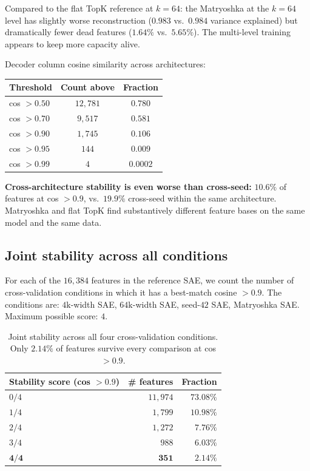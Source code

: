\documentclass[11pt]{article}
\begin{document}
Compared to the flat TopK reference at $k = 64$: the Matryoshka at the
$k = 64$ level has slightly worse reconstruction ($0.983$ vs.\ $0.984$
variance explained) but dramatically fewer dead features ($1.64\%$ vs.\
$5.65\%$). The multi-level training appears to keep more capacity alive.

Decoder column cosine similarity across architectures:

\begin{center}
\begin{tabular}{lcc}
\toprule
Threshold & Count above & Fraction \\
\midrule
cos $> 0.50$ & $12{,}781$ & $0.780$ \\
cos $> 0.70$ & $9{,}517$ & $0.581$ \\
cos $> 0.90$ & $1{,}745$ & $\mathbf{0.106}$ \\
cos $> 0.95$ & $144$ & $0.009$ \\
cos $> 0.99$ & $4$ & $0.0002$ \\
\bottomrule
\end{tabular}
\end{center}

\textbf{Cross-architecture stability is even worse than cross-seed:}
$10.6\%$ of features at cos $> 0.9$, vs.\ $19.9\%$ cross-seed within the
same architecture. Matryoshka and flat TopK find substantively different
feature bases on the same model and the same data.

\subsection{Joint stability across all conditions}
\label{sec:navigator}

For each of the $16{,}384$ features in the reference SAE, we count the
number of cross-validation conditions in which it has a best-match cosine
$> 0.9$. The conditions are: $4\text{k}$-width SAE, $64\text{k}$-width
SAE, seed-$42$ SAE, Matryoshka SAE. Maximum possible score: $4$.

\begin{table}[h]
\centering
\caption{Joint stability across all four cross-validation conditions.
Only $2.14\%$ of features survive every comparison at cos $> 0.9$.}
\label{tab:joint}
\begin{tabular}{lrr}
\toprule
Stability score (cos $> 0.9$) & \# features & Fraction \\
\midrule
$0 / 4$ & $11{,}974$ & $73.08\%$ \\
$1 / 4$ & $1{,}799$ & $10.98\%$ \\
$2 / 4$ & $1{,}272$ & $7.76\%$ \\
$3 / 4$ & $988$ & $6.03\%$ \\
$\mathbf{4 / 4}$ & $\mathbf{351}$ & $\mathbf{2.14\%}$ \\
\bottomrule
\end{tabular}
\end{table}
\end{document}
